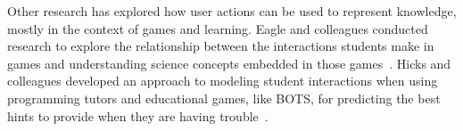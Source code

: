 Other research has explored how user actions can be used to represent knowledge, mostly in the context of games and learning. Eagle and colleagues conducted research to explore the relationship between the interactions students make in games and understanding science concepts embedded in those games~\cite{eagle2015measuring}. Hicks and colleagues developed an approach to modeling student interactions when using programming tutors and educational games, like BOTS, for predicting the best hints to provide when they are having trouble~\cite{hicks2014building}.






